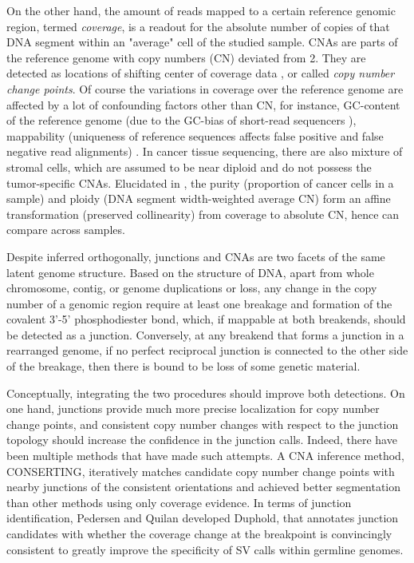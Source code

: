 \documentclass[phd,tocprelim]{cornell}
\begin{document}
On the other hand, the amount of reads mapped to a certain reference genomic region, termed \textit{coverage}, is a readout for the absolute number of copies of that DNA segment within an "average" cell of the studied sample. CNAs are parts of the reference genome with copy numbers (CN) deviated from 2. They are detected as locations of shifting center of coverage data \cite{Ha2014-ai,Xi2011-oa,Carter2012-xo,Favero2015-hj,Van_Loo2010-ed,Shen2016-fi}, or called \textit{copy number change points}. Of course the variations in coverage over the reference genome are affected by a lot of confounding factors other than CN, for instance, GC-content of the reference genome (due to the GC-bias of short-read sequencers \cite{Benjamini_Speed_2012}), mappability (uniqueness of reference sequences affects false positive and false negative read alignments) \cite{Lee_Schatz_2012}. In cancer tissue sequencing, there are also mixture of stromal cells, which are assumed to be near diploid and do not possess the tumor-specific CNAs. Elucidated in \cite{Carter2012-xo}, the purity (proportion of cancer cells in a sample) and ploidy (DNA segment width-weighted average CN) form an affine transformation (preserved collinearity) from coverage to absolute CN, hence can compare across samples.

Despite inferred orthogonally, junctions and CNAs are two facets of the same latent genome structure. Based on the structure of DNA, apart from whole chromosome, contig, or genome duplications or loss, any change in the copy number of a genomic region require at least one breakage and formation of the covalent 3'-5' phosphodiester bond, which, if mappable at both breakends, should be detected as a junction. Conversely, at any breakend that forms a junction in a rearranged genome, if no perfect reciprocal junction is connected to the other side of the breakage, then there is bound to be loss of some genetic material.

Conceptually, integrating the two procedures should improve both detections. On one hand, junctions provide much more precise localization for copy number change points, and consistent copy number changes with respect to the junction topology should increase the confidence in the junction calls. Indeed, there have been multiple methods that have made such attempts. A CNA inference method, CONSERTING\cite{Chen2015-sw}, iteratively matches candidate copy number change points with nearby junctions of the consistent orientations and achieved better segmentation than other methods using only coverage evidence. In terms of junction identification, Pedersen and Quilan developed Duphold, that annotates junction candidates with whether the coverage change at the breakpoint is convincingly consistent to greatly improve the specificity of SV calls within germline genomes.
\end{document}

